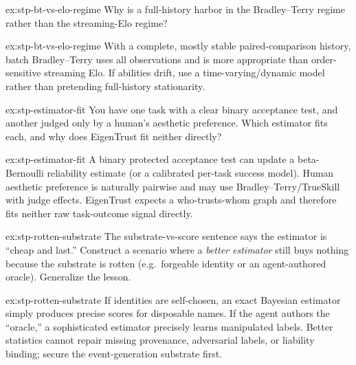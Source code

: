 \documentclass[11pt,a4paper]{article}
\theoremstyle{definition}
\begin{document}

\begin{pdexercise}[kind=Check,rating=1]{ex:stp-bt-vs-elo-regime}
Why is a full-history harbor in the Bradley--Terry regime rather than the
streaming-Elo regime?
\end{pdexercise}
\begin{pdsolution}{ex:stp-bt-vs-elo-regime}
With a complete, mostly stable paired-comparison history, batch
Bradley--Terry uses all observations and is more appropriate than
order-sensitive streaming Elo. If abilities drift, use a time-varying/dynamic
model rather than pretending full-history stationarity.
\end{pdsolution}
\begin{pdexercise}[kind=Trace,rating=2]{ex:stp-estimator-fit}
You have one task with a clear binary acceptance test, and another judged
only by a human's aesthetic preference. Which estimator fits each, and why
does EigenTrust fit neither directly?
\end{pdexercise}
\begin{pdsolution}{ex:stp-estimator-fit}
A binary protected acceptance test can update a beta-Bernoulli reliability
estimate (or a calibrated per-task success model). Human aesthetic preference
is naturally pairwise and may use Bradley--Terry/TrueSkill with judge
effects. EigenTrust expects a who-trusts-whom graph and therefore fits
neither raw task-outcome signal directly.
\end{pdsolution}
\begin{pdexercise}[kind=Open,rating=3]{ex:stp-rotten-substrate}
The substrate-vs-score sentence says the estimator is ``cheap and last.''
Construct a scenario where a \emph{better estimator} still buys nothing
because the substrate is rotten (e.g.\ forgeable identity or an
agent-authored oracle). Generalize the lesson.
\end{pdexercise}
\begin{pdsolution}{ex:stp-rotten-substrate}
If identities are self-chosen, an exact Bayesian estimator simply produces
precise scores for disposable names. If the agent authors the ``oracle,'' a
sophisticated estimator precisely learns manipulated labels. Better
statistics cannot repair missing provenance, adversarial labels, or
liability binding; secure the event-generation substrate first.
\end{pdsolution}

\end{document}
